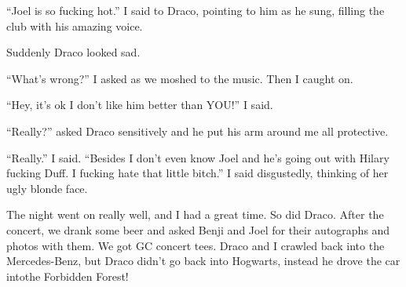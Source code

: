 \enquote{Joel is so fucking hot.} I said to Draco, pointing to him as he sung, filling the club with his amazing voice.

Suddenly Draco looked sad.

\enquote{What's wrong?} I asked as we moshed to the music. Then I caught on.

\enquote{Hey, it's ok I don't like him better than YOU!} I said.

\begin{sloppypar}
    \enquote{Really?} asked Draco sensitively and he put his arm around me all protective.
\end{sloppypar}

\enquote{Really.} I said. \enquote{Besides I don't even know Joel and he's going out with Hilary fucking Duff. I fucking hate that little bitch.} I said disgustedly, thinking of her ugly blonde face.

The night went on really well, and I had a great time. So did Draco. After the concert, we drank some beer and asked Benji and Joel for their autographs and photos with them. We got GC concert tees. Draco and I crawled back into the Mercedes-Benz, but Draco didn't go back into Hogwarts, instead he drove the car into\dotfill the Forbidden Forest!
